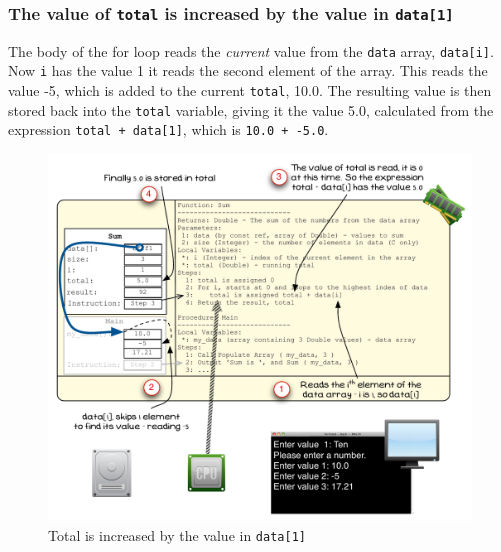 
\clearpage
\subsubsection{The value of \texttt{total} is increased by the value in \texttt{data[1]}} %
\label{ssub:the_value_of_total_is_increased_by_the_value_in_data[1]}

The body of the for loop reads the \emph{current} value from the \texttt{data} array, \texttt{data[i]}. Now \texttt{i} has the value 1 it reads the second element of the array. This reads the value -5, which is added to the current \texttt{total}, 10.0. The resulting value is then stored back into the \texttt{total} variable, giving it the value 5.0, calculated from the expression \texttt{total + data[1]}, which is \texttt{10.0 + -5.0}.

\begin{figure}[htbp]
   \centering
   \includegraphics[width=\textwidth]{./topics/arrays/images/Sum6} 
   \caption{Total is increased by the value in \texttt{data[1]}}
   \label{fig:sum-array-vis-6}
\end{figure}

